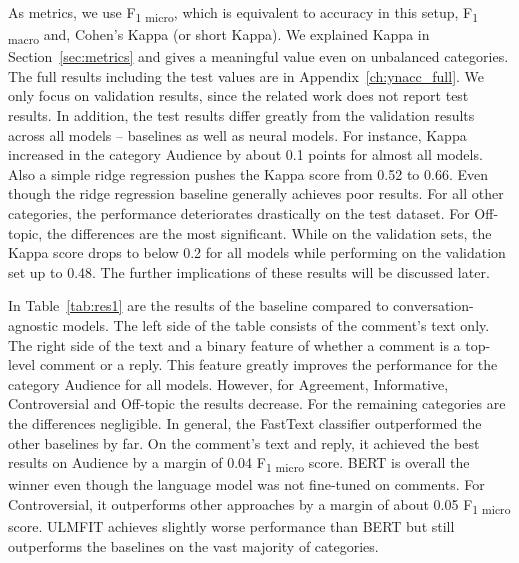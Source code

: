 As metrics, we use F\textsubscript{1 micro}, which is equivalent to accuracy in this setup, F\textsubscript{1 macro} and, Cohen's Kappa (or short Kappa).
We explained Kappa in Section~\ref{sec:metrics} and gives a meaningful value even on unbalanced categories.
The full results including the test values are in Appendix~\ref{ch:ynacc_full}.
We only focus on validation results, since the related work does not report test results.
In addition, the test results differ greatly from the validation results across all models -- baselines as well as neural models.
For instance, Kappa increased in the category Audience by about 0.1 points for almost all models.
Also a simple ridge regression pushes the Kappa score from 0.52 to 0.66.
Even though the ridge regression baseline generally achieves poor results.
For all other categories, the performance deteriorates drastically on the test dataset.
For Off-topic, the differences are the most significant.
While on the validation sets, the Kappa score drops to below 0.2 for all models while performing on the validation set up to 0.48.
The further implications of these results will be discussed later.

In Table~\ref{tab:res1} are the results of the baseline compared to conversation-agnostic models.
The left side of the table consists of the comment's text only.
The right side of the text and a binary feature of whether a comment is a top-level comment or a reply.
This feature greatly improves the performance for the category Audience for all models.
However, for Agreement, Informative, Controversial and Off-topic the results decrease.
For the remaining categories are the differences negligible. In general, the FastText classifier outperformed the other baselines by far.
On the comment's text and reply, it achieved the best results on Audience by a margin of 0.04 F\textsubscript{1 micro} score.
BERT is overall the winner even though the language model was not fine-tuned on comments.
For Controversial, it outperforms other approaches by a margin of about 0.05 F\textsubscript{1 micro} score.
ULMFIT achieves slightly worse performance than BERT but still outperforms the baselines on the vast majority of categories.

